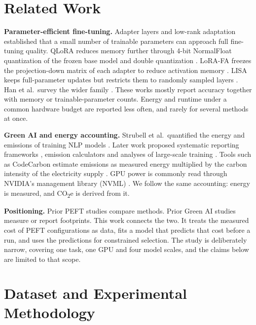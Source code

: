 \documentclass[conference]{IEEEtran}
\newcommand{\COtwo}{CO\textsubscript{2}e}
\begin{document}
\section{Related Work}

\textbf{Parameter-efficient fine-tuning.} Adapter layers \cite{houlsby2019adapters} and
low-rank adaptation \cite{hu2022lora} established that a small number of trainable
parameters can approach full fine-tuning quality. QLoRA reduces memory further through 4-bit
NormalFloat quantization of the frozen base model and double quantization
\cite{dettmers2023qlora}. LoRA-FA freezes the projection-down matrix of each adapter to
reduce activation memory \cite{zhang2023lorafa}. LISA keeps full-parameter updates but
restricts them to randomly sampled layers \cite{pan2024lisa}. Han et al.\ survey the wider
family \cite{han2024peftsurvey}. These works mostly report accuracy together with memory or
trainable-parameter counts. Energy and runtime under a common hardware budget are reported
less often, and rarely for several methods at once.

\textbf{Green AI and energy accounting.} Strubell et al.\ quantified the energy and emissions
of training NLP models \cite{strubell2019energy}. Later work proposed systematic reporting
frameworks \cite{henderson2020reporting}, emission calculators \cite{lacoste2019quantifying}
and analyses of large-scale training \cite{patterson2021carbon}. Tools such as CodeCarbon
estimate emissions as measured energy multiplied by the carbon intensity of the electricity
supply \cite{codecarbon2024}. GPU power is commonly read through NVIDIA's management library
(NVML) \cite{nvml}. We follow the same accounting: energy is measured, and \COtwo{} is
derived from it.

\textbf{Positioning.} Prior PEFT studies compare methods. Prior Green AI studies measure or
report footprints. This work connects the two. It treats the measured cost of PEFT
configurations as data, fits a model that predicts that cost before a run, and uses the
predictions for constrained selection. The study is deliberately narrow, covering one task,
one GPU and four model scales, and the claims below are limited to that scope.

\section{Dataset and Experimental Methodology}
\end{document}

